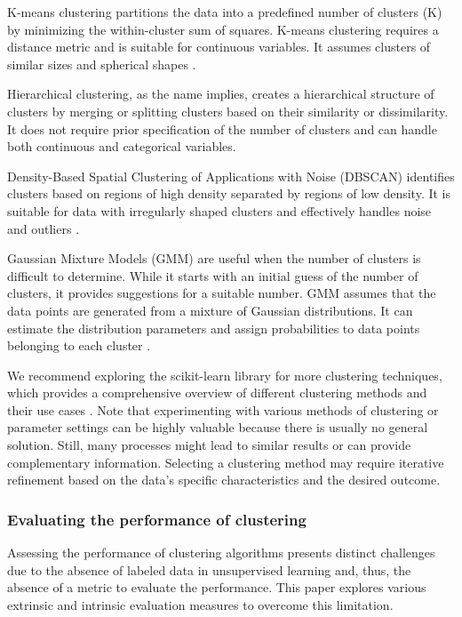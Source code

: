 \documentclass[9pt,bestpractices]{livecoms}
\begin{document}
K-means clustering partitions the data into a predefined number of clusters (K) by minimizing the within-cluster sum of squares. K-means clustering requires a distance metric and is suitable for continuous variables. It assumes clusters of similar sizes and spherical shapes \cite{RN19}.

Hierarchical clustering, as the name implies, creates a hierarchical structure of clusters by merging or splitting clusters based on their similarity or dissimilarity. It does not require prior specification of the number of clusters and can handle both continuous and categorical variables.\cite{RN148} 

Density-Based Spatial Clustering of Applications with Noise (DBSCAN) identifies clusters based on regions of high density separated by regions of low density. It is suitable for data with irregularly shaped clusters and effectively handles noise and outliers \cite{RN96}.

Gaussian Mixture Models (GMM) are useful when the number of clusters is difficult to determine. While it starts with an initial guess of the number of clusters, it provides suggestions for a suitable number. GMM assumes that the data points are generated from a mixture of Gaussian distributions. It can estimate the distribution parameters and assign probabilities to data points belonging to each cluster \cite{RN18}.

We recommend exploring the scikit-learn library for more clustering techniques, which provides a comprehensive overview of different clustering methods and their use cases \cite{RN148}. Note that experimenting with various methods of clustering or parameter settings can be highly valuable because there is usually no general solution. Still, many processes might lead to similar results or can provide complementary information. Selecting a clustering method may require iterative refinement based on the data's specific characteristics and the desired outcome. 

\subsubsection{Evaluating the performance of clustering}

Assessing the performance of clustering algorithms presents distinct challenges due to the absence of labeled data in unsupervised learning and, thus, the absence of a metric to evaluate the performance. This paper explores various extrinsic and intrinsic evaluation measures to overcome this limitation.
\end{document}
